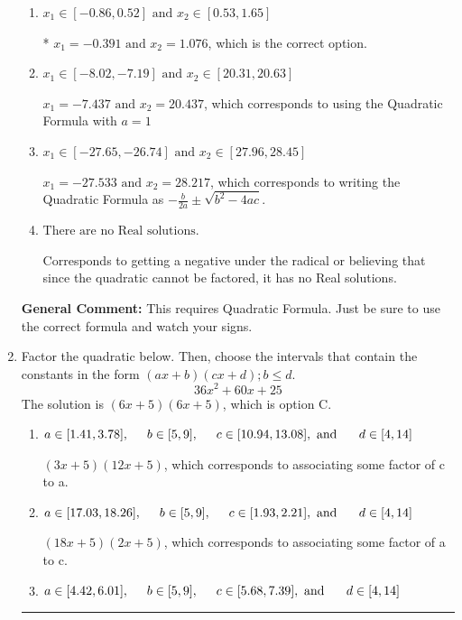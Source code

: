 \documentclass{extbook}[14pt]
\newcommand{\litem}[1]{\item #1

\rule{\textwidth}{0.4pt}}
\begin{document}
\begin{enumerate}
{\begin{enumerate}[label=\Alph*.]
 $x_1 = -1.076 \text{ and } x_2 = 0.391$, which corresponds to writing the Quadratic Formula as $\frac{b \pm \sqrt{b^2 - 4ac}}{2a}$
\item \( x_1 \in [-0.86, 0.52] \text{ and } x_2 \in [0.53, 1.65] \)

* $x_1 = -0.391 \text{ and } x_2 = 1.076$, which is the correct option.
\item \( x_1 \in [-8.02, -7.19] \text{ and } x_2 \in [20.31, 20.63] \)

 $x_1 = -7.437 \text{ and } x_2 = 20.437$, which corresponds to using the Quadratic Formula with $a=1$
\item \( x_1 \in [-27.65, -26.74] \text{ and } x_2 \in [27.96, 28.45] \)

 $x_1 = -27.533 \text{ and } x_2 = 28.217$, which corresponds to writing the Quadratic Formula as $-\frac{b}{2a} \pm \sqrt{b^2 - 4ac}$.
\item \( \text{There are no Real solutions.} \)

Corresponds to getting a negative under the radical or believing that since the quadratic cannot be factored, it has no Real solutions.
\end{enumerate}

\textbf{General Comment:} This requires Quadratic Formula. Just be sure to use the correct formula and watch your signs.
}
\litem{
Factor the quadratic below. Then, choose the intervals that contain the constants in the form $(ax+b)(cx+d); b \leq d.$
\[ 36x^{2} +60 x + 25 \]The solution is \( (6x + 5)(6x + 5) \), which is option C.\begin{enumerate}[label=\Alph*.]
\item \( a \in [1.41, 3.78], \hspace*{5mm} b \in [5, 9], \hspace*{5mm} c \in [10.94, 13.08], \text{ and } \hspace*{5mm} d \in [4, 14] \)

 $(3x + 5)(12x + 5)$, which corresponds to associating some factor of c to a.
\item \( a \in [17.03, 18.26], \hspace*{5mm} b \in [5, 9], \hspace*{5mm} c \in [1.93, 2.21], \text{ and } \hspace*{5mm} d \in [4, 14] \)

 $(18x + 5)(2x + 5)$, which corresponds to associating some factor of a to c.
\item \( a \in [4.42, 6.01], \hspace*{5mm} b \in [5, 9], \hspace*{5mm} c \in [5.68, 7.39], \text{ and } \hspace*{5mm} d \in [4, 14] \)


\end{enumerate}}
\end{enumerate}
\end{document}
